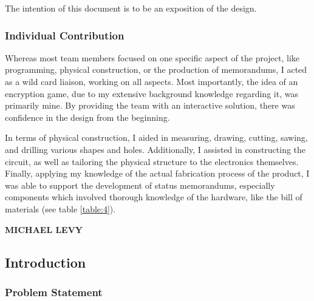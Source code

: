 \documentclass[conference]{IEEEtran}
\begin{document}
\par The intention of this document is to be an exposition of the design.

\subsubsection{Individual Contribution}

\par Whereas most team members focused on one specific aspect of the project, like programming, physical construction, or the production of memorandums, I acted as a wild card liaison, working on all aspects. Most importantly, the idea of an encryption game, due to my extensive background knowledge regarding it, was primarily mine. By providing the team with an interactive solution, there was confidence in the design from the beginning.
\par In terms of physical construction, I aided in measuring, drawing, cutting, sawing, and drilling various shapes and holes. Additionally, I assisted in constructing the circuit, as well as tailoring the physical structure to the electronics themselves. Finally, applying my knowledge of the actual fabrication process of the product, I was able to support the development of status memorandums, especially components which involved thorough knowledge of the hardware, like the bill of materials (see table \ref{table:4}).

\newpage


\vspace{10pt} \LARGE \textbf{MICHAEL LEVY} \normalsize

\subsection{Introduction}

\subsubsection{Problem Statement}
\end{document}

